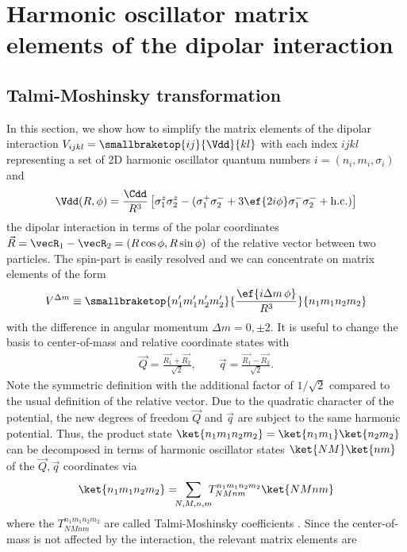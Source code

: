 \chapter{Harmonic oscillator matrix elements of the dipolar interaction}
\label{matrix_elements}

\section{Talmi-Moshinsky transformation}
In this section, we show how to simplify the matrix elements of the dipolar interaction $V_{ijkl}=\smallbraketop{ij}{\Vdd}{kl}$ with each index $ijkl$ representing a set of 2D harmonic oscillator quantum numbers $i=(n_i,m_i,\sigma_i)$ and
\begin{align}
\Vdd(R,\phi) =  \frac{\Cdd}{R^3} \left[
\sigma^z_1 \sigma^z_2 - (\sigma^+_1 \sigma^-_2 +3 \ef{2i\phi} \sigma^-_1 \sigma^-_2  +\text{h.c.})
\right]
\end{align}
the dipolar interaction in terms of the polar coordinates $\vec{R}=\vecR_1-\vecR_2=(R\cos \phi, R\sin \phi)$ of the relative vector between two particles. The spin-part is easily resolved and we can concentrate on matrix elements of the form
\begin{align}
V^{\Delta m}\equiv\smallbraketop{n_1'm_1'n_2'm_2'}{\frac{\ef{i\Delta m\, \phi}}{R^3}}{n_1m_1n_2m_2}
\end{align}
with the difference in angular momentum $\Delta m = 0, \pm 2$.
It is useful to change the basis to center-of-mass and relative coordinate states with
\begin{align}
    \vec{Q} = \frac{\vec{R_1} + \vec{R_2}}{\sqrt{2}}, \qquad \vec{q} = \frac{\vec{R_1} - \vec{R_2}}{\sqrt{2}}.
\end{align}
Note the symmetric definition with the additional factor of $1/\sqrt{2}$ compared to the usual definition of the relative vector.
Due to the quadratic character of the potential, the new degrees of freedom $\vec{Q}$ and $\vec{q}$ are subject to the same harmonic potential. Thus, the product state $\ket{n_1m_1n_2m_2}=\ket{n_1m_1}\ket{n_2m_2}$ can be decomposed in terms of harmonic oscillator states $\ket{NM}\ket{nm}$ of the $\vec{Q},\vec{q}$ coordinates via
\begin{align}
\ket{n_1m_1n_2m_2} = \!\!\! \sum_{N,M,n,m} \!\!\! T^{n_1m_1n_2m_2}_{NMnm} \ket{NMnm}
\end{align}
where the $T^{n_1m_1n_2m_2}_{NMnm}$ are called Talmi-Moshinsky coefficients \cite{Moshinsky1959,Talmi1952}. Since the center-of-mass is not affected by the interaction, the relevant matrix elements are

